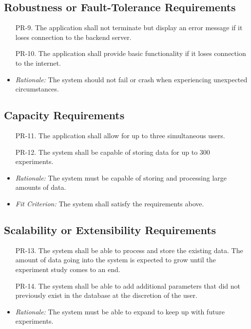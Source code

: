 \documentclass[12pt]{article}
\begin{document}
\subsection{Robustness or Fault-Tolerance Requirements}
\begin{enumerate}
  \item[PR-9.] The application shall not terminate but display an error message if it loses connection to the backend server.
  \item[PR-10.] The application shall provide basic functionality if it loses connection to the internet.
\end{enumerate}
\begin{itemize}
  \item \textit{Rationale:} The system should not fail or crash when
  experiencing unexpected circumstances.
\end{itemize}

\subsection{Capacity Requirements}
\begin{enumerate}
  \item[PR-11.] The application shall allow for up to three simultaneous users.
  \item[PR-12.] The system shall be capable of storing data for up to 300 experiments.
\end{enumerate}
\begin{itemize}
  \item \textit{Rationale:} The system must be capable of storing and processing
  large amounts of data.
  \item \textit{Fit Criterion:} The system shall satisfy the requirements above.
\end{itemize}

\subsection{Scalability or Extensibility Requirements}
\begin{enumerate}
  \item[PR-13.] The system shall be able to process and store the existing data. The amount of data going into the system is expected to grow until the experiment study comes to an end.
  \item[PR-14.] The system shall be able to add additional parameters that did not previously exist in the database at the discretion of the user.
\end{enumerate}
\begin{itemize}
  \item \textit{Rationale:} The system must be able to expand to keep up with
  future experiments.
\end{itemize}
\end{document}
